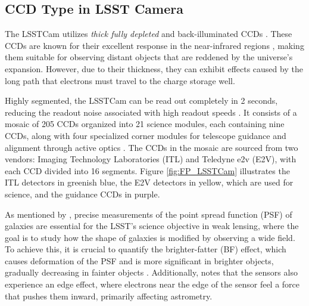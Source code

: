 \subsection{CCD Type in LSST Camera}

The LSSTCam utilizes \textit{thick fully depleted} and back-illuminated CCDs \citep{2009arXiv0912.0201L}. These CCDs are known for their excellent response in the near-infrared regions \citep{lage2017measurements}, making them suitable for observing distant objects that are reddened by the universe's expansion. However, due to their thickness, they can exhibit effects caused by the long path that electrons must travel to the charge storage well.

\vspace{3mm}
Highly segmented, the LSSTCam can be read out completely in 2 seconds, reducing the readout noise associated with high readout speeds \citep{2009arXiv0912.0201L}. It consists of a mosaic of 205 CCDs organized into 21 science modules, each containing nine CCDs, along with four specialized corner modules for telescope guidance and alignment through active optics \citep{snyder2020laboratory}. The CCDs in the mosaic are sourced from two vendors: Imaging Technology Laboratories (ITL) and Teledyne e2v (E2V), with each CCD divided into 16 segments. Figure \ref{fig:FP_LSSTCam} illustrates the ITL detectors in greenish blue, the E2V detectors in yellow, which are used for science, and the guidance CCDs in purple.

\vspace{3mm}
As mentioned by \cite{walter2015brighter}, precise measurements of the point spread function (PSF) of galaxies are essential for the LSST's science objective in weak lensing, where the goal is to study how the shape of galaxies is modified by observing a wide field. To achieve this, it is crucial to quantify the brighter-fatter (BF) effect, which causes deformation of the PSF and is more significant in brighter objects, gradually decreasing in fainter objects \citep{lage2017measurements}. Additionally, \cite{walter2015brighter} notes that the sensors also experience an edge effect, where electrons near the edge of the sensor feel a force that pushes them inward, primarily affecting astrometry.


